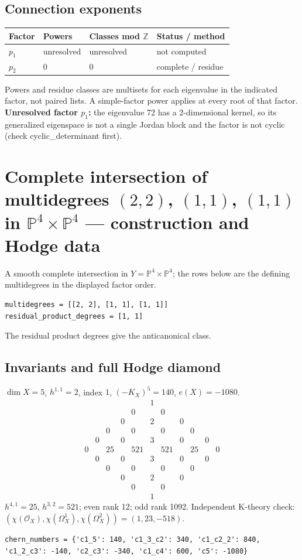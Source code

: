 \documentclass[10pt,a4paper]{article}
\begin{document}
\subsection*{Connection exponents}
\begin{center}\begin{tabular}{llll}\toprule Factor & Powers & Classes mod $\mathbb Z$ & Status / method\\\midrule
$p_{1}$ & unresolved & unresolved & not computed\\
$p_{2}$ & $0$ & $0$ & complete / residue\\
\bottomrule\end{tabular}\end{center}
Powers and residue classes are multisets for each eigenvalue in the indicated factor, not paired lists. A simple-factor power applies at every root of that factor.
\textbf{Unresolved factor $p_{1}$:} the eigenvalue 72 has a 2-dimensional kernel, so its generalized eigenspace is not a single Jordan block and the factor is not cyclic (check cyclic\_determinant first).
\clearpage\section*{Complete intersection of multidegrees $(2,2)$, $(1,1)$, $(1,1)$ in $\mathbb P^{4}\times \mathbb P^{4}$ --- construction and Hodge data}\label{entry:PROD5-E01}
A smooth complete intersection in $Y=\mathbb P^{4}\times\mathbb P^{4}$; the rows below are the defining multidegrees in the displayed factor order.
\begin{lstlisting}
multidegrees = [[2, 2], [1, 1], [1, 1]]
residual_product_degrees = [1, 1]
\end{lstlisting}
The residual product degrees give the anticanonical class.
\subsection*{Invariants and full Hodge diamond}
$\dim X=5$, $h^{1,1}=2$, index $1$, $(-K_X)^5=140$, $e(X)=-1080$.
\[\begin{array}{ccccccccccc}&&&&&1&&&&&\\&&&&0&&0&&&&\\&&&0&&2&&0&&&\\&&0&&0&&0&&0&&\\&0&&0&&3&&0&&0&\\0&&25&&521&&521&&25&&0\\&0&&0&&3&&0&&0&\\&&0&&0&&0&&0&&\\&&&0&&2&&0&&&\\&&&&0&&0&&&&\\&&&&&1&&&&&\end{array}\]
$h^{4,1}=25$, $h^{3,2}=521$; even rank 12; odd rank 1092.
Independent K-theory check: $(\chi(\mathcal O_X),\chi(\Omega_X^1),\chi(\Omega_X^2))=(1, 23, -518)$.
\begin{lstlisting}
chern_numbers = {'c1_5': 140, 'c1_3_c2': 340, 'c1_c2_2': 840, 'c1_2_c3': -140, 'c2_c3': -340, 'c1_c4': 600, 'c5': -1080}
\end{lstlisting}
\end{document}
